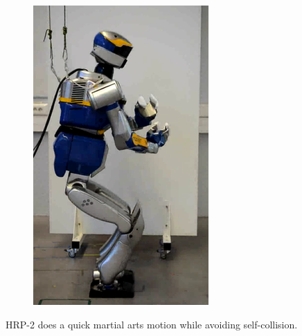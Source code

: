 \begin{figure}
\begin{subfigure}{0.19\columnwidth}
    \includegraphics[width = \columnwidth]
                    {src/chap3-optimal-motion-planning/figure/self-collision-10.png}
    \label{self-collision-10}
  \end{subfigure}
  \caption{HRP-2 does a quick martial arts motion while avoiding
    self-collision.}
  \label{self-collision}
\end{figure}

